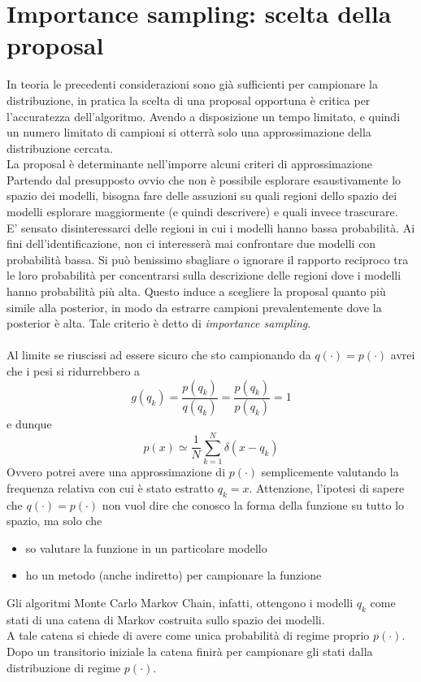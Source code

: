 \documentclass[10pt,a4paper,oneside,openany,noindent]{book}
\begin{document}
\section{Importance sampling: scelta della proposal}
In teoria le precedenti considerazioni sono già sufficienti per campionare la distribuzione, in pratica la scelta di una proposal opportuna è critica per l'accuratezza dell'algoritmo. Avendo a disposizione un tempo limitato, e quindi un numero limitato di campioni si otterrà solo una approssimazione della distribuzione cercata.\\
La proposal è determinante nell'imporre alcuni criteri di approssimazione\\
Partendo dal presupposto ovvio che non è possibile esplorare esaustivamente lo spazio dei modelli, bisogna fare delle assuzioni su quali regioni dello spazio dei modelli esplorare maggiormente (e quindi descrivere) e quali invece trascurare.\\
E' sensato disinteressarci delle regioni in cui i modelli hanno bassa probabilità.
Ai fini dell'identificazione, non ci interesserà mai confrontare due modelli con probabilità bassa. Si può benissimo sbagliare o ignorare il rapporto reciproco tra le loro probabilità per concentrarsi sulla descrizione delle regioni dove i modelli hanno probabilità più alta.
Questo induce a scegliere la proposal quanto più simile alla posterior, in modo da estrarre campioni prevalentemente dove la posterior è alta.
Tale criterio è detto di \emph{importance sampling}.\\ \\
Al limite se riuscissi ad essere sicuro che sto campionando da $q(\cdot)=p(\cdot)$ 
avrei che i pesi si ridurrebbero a
\begin{equation}
g(q_k)=\frac{p(q_k)}{q(q_k)}=\frac{p(q_k)}{p(q_k)}=1
\end{equation}
e dunque
\begin{equation}
p(x)\simeq \frac{1}{N}\sum_{k=1}^N \delta(x-q_k)
\end{equation}
Ovvero potrei avere una approssimazione di $p(\cdot)$ semplicemente valutando la frequenza relativa con cui è stato estratto $q_k=x$.
Attenzione, l'ipotesi di sapere che $q(\cdot)=p(\cdot)$ non vuol dire che conosco la forma della funzione su tutto lo spazio, ma solo che
\begin{itemize}
\item so valutare la funzione in un particolare modello
\item ho un metodo (anche indiretto) per campionare la funzione
\end{itemize}

Gli algoritmi Monte Carlo Markov Chain, infatti, ottengono i modelli $q_k$ 
come stati di una catena di Markov costruita sullo spazio dei modelli.\\ A  tale catena si chiede di avere come unica probabilità di regime proprio $p(\cdot)$.\vspace{2em}\\
Dopo un transitorio iniziale la catena finirà per campionare gli stati dalla distribuzione di regime $p(\cdot)$.









\end{document}
